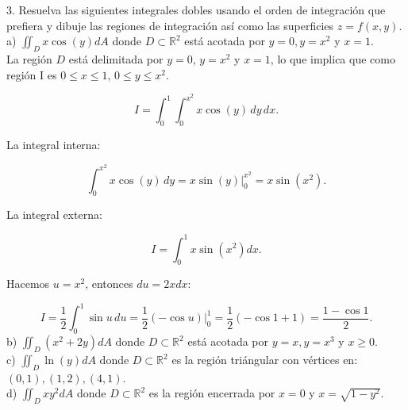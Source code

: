 3. Resuelva las siguientes integrales dobles usando el orden de integración que prefiera y dibuje las regiones de integración así como las superficies \( z=f(x, y) \). \\
a) \( \iint_{D} x \cos (y) d A \) donde \( D \subset \mathbb{R}^{2} \) está acotada por \( y=0, y=x^{2} \) y \( x=1 \). \\
La región \( D \) está delimitada por \( y = 0 \), \( y = x^2 \) y \( x = 1 \), lo que implica que como región I es \( 0 \leq x \leq 1 \), \( 0 \leq y \leq x^2 \).  

\[
I = \int_0^1 \int_0^{x^2} x \cos(y) \, dy \, dx.
\]

La integral interna:

\[
\int_0^{x^2} x \cos(y) \, dy = x \sin(y) \Big|_0^{x^2} = x \sin(x^2).
\]

La integral externa:

\[
I = \int_0^1 x \sin(x^2) dx.
\]

Hacemos \( u = x^2 \), entonces \( du = 2x dx \):

\[
I = \frac{1}{2} \int_0^1 \sin u \, du = \frac{1}{2} (-\cos u) \Big|_0^1 = \frac{1}{2} (-\cos 1 + 1)  = \frac{1 - \cos 1}{2}.
\]
b) \( \iint_{D}\left(x^{2}+2 y\right) d A \) donde \( D \subset \mathbb{R}^{2} \) está acotada por \( y=x, y=x^{3} \) y \( x \geq 0 \). \\
c) \( \iint_{D} \ln (y) d A \) donde \( D \subset \mathbb{R}^{2} \) es la región triángular con vértices en: \( (0,1),(1,2),(4,1) \). \\
d) \( \iint_{D} x y^{2} d A \) donde \( D \subset \mathbb{R}^{2} \) es la región encerrada por \( x=0 \) y \( x=\sqrt{1-y^{2}} \). \\